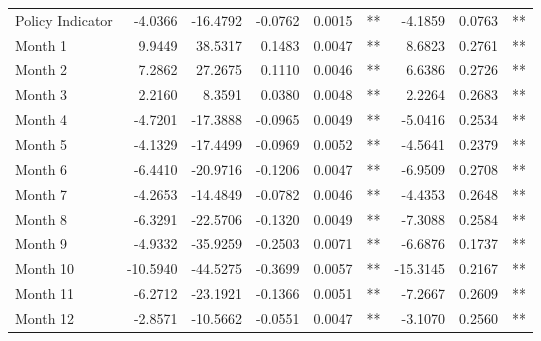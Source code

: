 \begin{table}
\begin{tabular}{l r r r r l r r l}
Policy Indicator          &  -4.0366        &  -16.4792       &  -0.0762        &  0.0015       &   **       &  -4.1859        &  0.0763       &   **       \\ 
Month 1                         &  9.9449        &  38.5317       &  0.1483        &  0.0047       &   **       &  8.6823        &  0.2761       &   **       \\ 
Month 2                         &  7.2862        &  27.2675       &  0.1110        &  0.0046       &   **       &  6.6386        &  0.2726       &   **       \\ 
Month 3                         &  2.2160        &  8.3591       &  0.0380        &  0.0048       &   **       &  2.2264        &  0.2683       &   **       \\ 
Month 4                         &  -4.7201        &  -17.3888       &  -0.0965        &  0.0049       &   **       &  -5.0416        &  0.2534       &   **       \\ 
Month 5                         &  -4.1329        &  -17.4499       &  -0.0969        &  0.0052       &   **       &  -4.5641        &  0.2379       &   **       \\ 
Month 6                         &  -6.4410        &  -20.9716       &  -0.1206        &  0.0047       &   **       &  -6.9509        &  0.2708       &   **       \\ 
Month 7                         &  -4.2653        &  -14.4849       &  -0.0782        &  0.0046       &   **       &  -4.4353        &  0.2648       &   **       \\ 
Month 8                         &  -6.3291        &  -22.5706       &  -0.1320        &  0.0049       &   **       &  -7.3088        &  0.2584       &   **       \\ 
Month 9                         &  -4.9332        &  -35.9259       &  -0.2503        &  0.0071       &   **       &  -6.6876        &  0.1737       &   **       \\ 
Month 10                        &  -10.5940        &  -44.5275       &  -0.3699        &  0.0057       &   **       &  -15.3145        &  0.2167       &   **       \\ 
Month 11                        &  -6.2712        &  -23.1921       &  -0.1366        &  0.0051       &   **       &  -7.2667        &  0.2609       &   **       \\ 
Month 12                        &  -2.8571        &  -10.5662       &  -0.0551        &  0.0047       &   **       &  -3.1070        &  0.2560       &   **       \\ 


\end{tabular}
\end{table}

